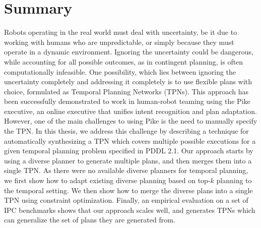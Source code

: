 \section*{\Huge Summary}
Robots operating in the real world must deal with uncertainty,
be it due to working with humans who are unpredictable, or simply 
because they must operate in a dynamic environment.
Ignoring the uncertainty could be dangerous, while accounting 
for all possible outcomes, as in contingent planning, is often 
computationally infeasible.
One possibility, which lies between ignoring the uncertainty 
completely and addressing it completely is to use flexible 
plans with choice, formulated as Temporal Planning Networks (TPNs).
This approach has been successfully demonstrated to work in 
human-robot teaming using the Pike executive, an online executive
that unifies intent recognition and plan adaptation.
However, one of the main challenges to using Pike is the need 
to manually specify the TPN. In this thesis, we address this 
challenge by describing a technique for automatically synthesizing 
a TPN which covers multiple possible executions for a given temporal
planning problem specified in PDDL 2.1. Our approach starts by
using a diverse planner to generate multiple plans, and then merges
them into a single TPN. As there were no available diverse planners
for temporal planning, we first show how to adapt existing 
diverse planning based on top-$k$ planning to the temporal 
setting. We then show how to merge the diverse plans into a
single TPN using constraint optimization. Finally, an empirical
evaluation on a set of IPC benchmarks shows that our approach
scales well, and generates TPNs which can generalize the set of
plans they are generated from.

\afterpage{\null\newpage}
